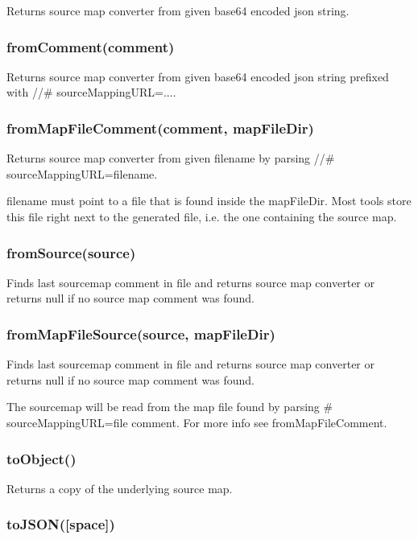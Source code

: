 Returns source map converter from given base64 encoded json string.

\subsubsection*{from\+Comment(comment)}

Returns source map converter from given base64 encoded json string prefixed with {\ttfamily //\# source\+Mapping\+U\+RL=...}.

\subsubsection*{from\+Map\+File\+Comment(comment, map\+File\+Dir)}

Returns source map converter from given {\ttfamily filename} by parsing {\ttfamily //\# source\+Mapping\+U\+RL=filename}.

{\ttfamily filename} must point to a file that is found inside the {\ttfamily map\+File\+Dir}. Most tools store this file right next to the generated file, i.\+e. the one containing the source map.

\subsubsection*{from\+Source(source)}

Finds last sourcemap comment in file and returns source map converter or returns null if no source map comment was found.

\subsubsection*{from\+Map\+File\+Source(source, map\+File\+Dir)}

Finds last sourcemap comment in file and returns source map converter or returns null if no source map comment was found.

The sourcemap will be read from the map file found by parsing {\ttfamily \# source\+Mapping\+U\+RL=file} comment. For more info see from\+Map\+File\+Comment.

\subsubsection*{to\+Object()}

Returns a copy of the underlying source map.

\subsubsection*{to\+J\+S\+O\+N(\mbox{[}space\mbox{]})}

